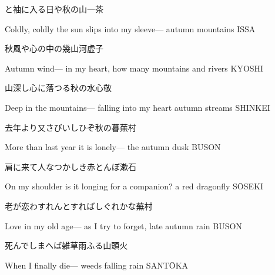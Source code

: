 \begin{haiku}
    {\FH {}と袖に入る日や秋の山}\hfill{\FH 一茶}

    \vin{} Coldly, coldly
    \vin{} \vin{} the sun slips into my sleeve---
    \vin{} \vin{} \vin{} autumn mountains \hspace{\fill} ISSA
\end{haiku}

\begin{haiku}
    {\FH 秋風や心の中の幾山河}\hfill{\FH 虚子}

    \vin{} Autumn wind---
    \vin{} \vin{} in my heart, how many
    \vin{} \vin{} \vin{} mountains and rivers \hspace{\fill} KYOSHI
\end{haiku}

\begin{haiku}
    {\FH 山深し心に落つる秋の水}\hfill{\FH 心敬}

    \vin{} Deep in the mountains---
    \vin{} \vin{} falling into my heart
    \vin{} \vin{} \vin{} autumn streams \hspace{\fill} SHINKEI
\end{haiku}

\begin{haiku}
    {\FH 去年より又さびいしひぞ秋の暮}\hfill{\FH 蕪村}

    \vin{} More than last year
    \vin{} \vin{} it is lonely---
    \vin{} \vin{} \vin{} the autumn dusk \hspace{\fill} BUSON
\end{haiku}

\begin{haiku}
    {\FH 肩に来て人なつかしき赤とんぼ}\hfill{\FH 漱石}

    \vin{} On my shoulder
    \vin{} \vin{} is it longing for a companion?
    \vin{} \vin{} \vin{} a red dragonfly \hspace{\fill} S\={O}SEKI
\end{haiku}

\begin{haiku}
    {\FH 老が恋わすれんとすればしぐれかな}\hfill{\FH 蕪村}

    \vin{} Love in my old age---
    \vin{} \vin{} as I try to forget,
    \vin{} \vin{} \vin{} late autumn rain \hspace{\fill} BUSON
\end{haiku}

\begin{haiku}
    {\FH 死んでしまへば雑草雨ふる}\hfill{\FH 山頭火}

    \vin{} When I finally die---
    \vin{} \vin{} weeds
    \vin{} \vin{} \vin{} falling rain \hspace{\fill} SANT\={O}KA
\end{haiku}

